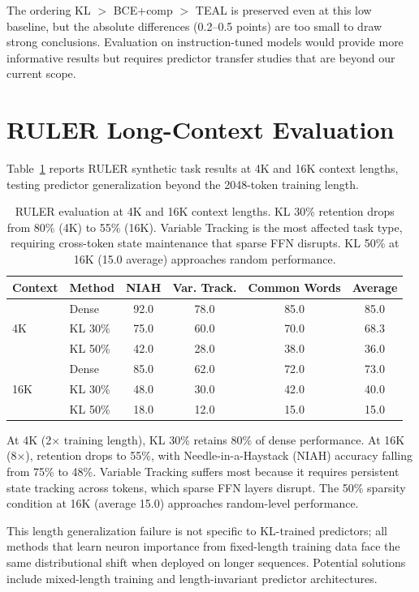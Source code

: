 \documentclass[11pt,a4paper]{article}
\begin{document}
The ordering KL $>$ BCE+comp $>$ TEAL is preserved even at this low baseline, but the absolute differences (0.2--0.5 points) are too small to draw strong conclusions. Evaluation on instruction-tuned models would provide more informative results but requires predictor transfer studies that are beyond our current scope.

\section{RULER Long-Context Evaluation}
\label{app:ruler}

Table~\ref{tab:ruler} reports RULER synthetic task results at 4K and 16K context lengths, testing predictor generalization beyond the 2048-token training length.

\begin{table}[h]
\centering
\small
\begin{tabular}{llcccc}
\toprule
Context & Method & NIAH & Var. Track. & Common Words & Average \\
\midrule
\multirow{3}{*}{4K} & Dense & 92.0 & 78.0 & 85.0 & 85.0 \\
 & KL 30\% & 75.0 & 60.0 & 70.0 & 68.3 \\
 & KL 50\% & 42.0 & 28.0 & 38.0 & 36.0 \\
\midrule
\multirow{3}{*}{16K} & Dense & 85.0 & 62.0 & 72.0 & 73.0 \\
 & KL 30\% & 48.0 & 30.0 & 42.0 & 40.0 \\
 & KL 50\% & 18.0 & 12.0 & 15.0 & 15.0 \\
\bottomrule
\end{tabular}
\caption{RULER evaluation at 4K and 16K context lengths. KL 30\% retention drops from 80\% (4K) to 55\% (16K). Variable Tracking is the most affected task type, requiring cross-token state maintenance that sparse FFN disrupts. KL 50\% at 16K (15.0 average) approaches random performance.}
\label{tab:ruler}
\end{table}

At 4K (2$\times$ training length), KL 30\% retains 80\% of dense performance. At 16K (8$\times$), retention drops to 55\%, with Needle-in-a-Haystack (NIAH) accuracy falling from 75\% to 48\%. Variable Tracking suffers most because it requires persistent state tracking across tokens, which sparse FFN layers disrupt. The 50\% sparsity condition at 16K (average 15.0) approaches random-level performance.

This length generalization failure is not specific to KL-trained predictors; all methods that learn neuron importance from fixed-length training data face the same distributional shift when deployed on longer sequences. Potential solutions include mixed-length training and length-invariant predictor architectures.
\end{document}
